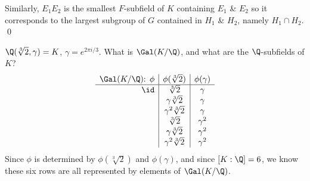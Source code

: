 Similarly, $E_1E_2$ is the smallest $F$-subfield of $K$ containing $E_1$ \& $E_2$ so it corresponds to the largest subgroup of $G$ contained in $H_1$ \& $H_2$, namely $H_1\cap H_2$. \qed

\eg $\Q(\sqrt[3]{2},\gamma)=K$, $\gamma=e^{2\pi i/3}$.  What is $\Gal(K/\Q)$, and what are the $\Q$-subfields of $K$?
\[\begin{array}{r|c|c}
\text{$\Gal(K/\Q)$: $\phi$} & \phi(\sqrt[3]{2}) & \phi(\gamma) \\ \hline
\id & \sqrt[3]{2} & \gamma \\
& \gamma\sqrt[3]{2} & \gamma \\
& \gamma^2\sqrt[3]{2} & \gamma \\
& \sqrt[3]{2} & \gamma^2 \\
& \gamma\sqrt[3]{2} & \gamma^2 \\
& \gamma^2\sqrt[3]{2} & \gamma^2
\end{array}\]
Since $\phi$ is determined by $\phi(\sqrt[3]{2})$ and $\phi(\gamma)$, and since $[K:\Q]=6$, we know these six rows are all represented by elements of $\Gal(K/\Q)$.
